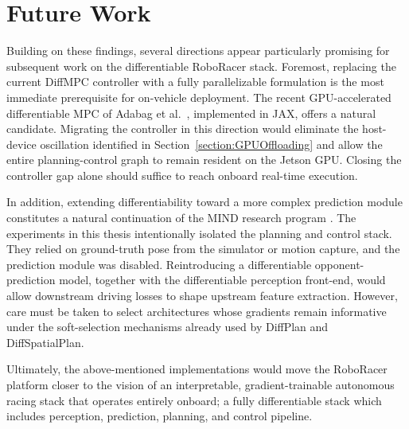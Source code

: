\section{Future Work}
\label{section:ConclusionFutureWork}

Building on these findings, several directions appear particularly promising for subsequent work on the differentiable RoboRacer stack.
Foremost, replacing the current DiffMPC controller with a fully parallelizable formulation is the most immediate prerequisite for on-vehicle deployment.
The recent GPU-accelerated differentiable MPC of Adabag et al.\ \cite{adabag_DifferentiableModelPredictive_2025}, implemented in JAX, offers a natural candidate.
Migrating the controller in this direction would eliminate the host-device oscillation identified in Section~\ref{section:GPUOffloading} and allow the entire planning-control graph to remain resident on the Jetson GPU.
Closing the controller gap alone should suffice to reach onboard real-time execution.

In addition, extending differentiability toward a more complex prediction module constitutes a natural continuation of the MIND research program \cite{jahncke_MINDStackModularInterpretable_2025, huang_DifferentiableIntegratedMotion_2024, karkus_DiffStackDifferentiableModular_2022}.
The experiments in this thesis intentionally isolated the planning and control stack.
They relied on ground-truth pose from the simulator or motion capture, and the prediction module was disabled.
Reintroducing a differentiable opponent-prediction model, together with the differentiable perception front-end, would allow downstream driving losses to shape upstream feature extraction.
However, care must be taken to select architectures whose gradients remain informative under the soft-selection mechanisms already used by DiffPlan and DiffSpatialPlan.

Ultimately, the above-mentioned implementations would move the RoboRacer platform closer to the vision of an interpretable, gradient-trainable autonomous racing stack that operates entirely onboard; a fully differentiable stack which includes perception, prediction, planning, and control pipeline.
